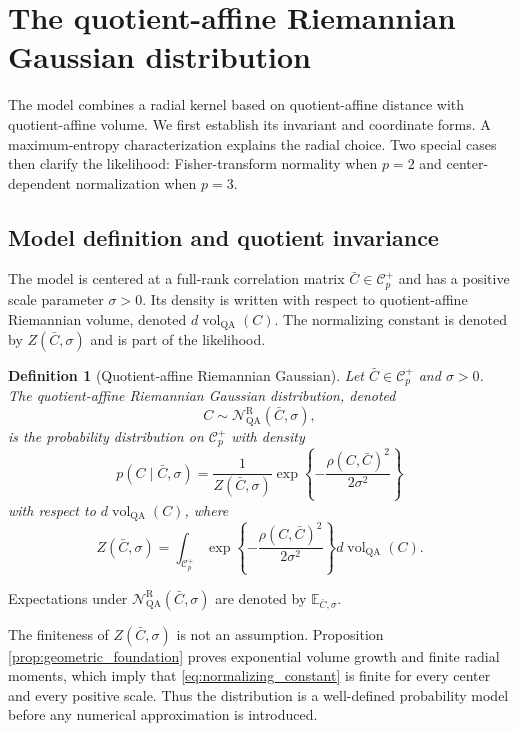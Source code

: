 \documentclass[
  12pt]{article}
\newcommand{\Corr}{\mathcal C^+}
\newcommand{\vol}{\operatorname{vol}}
\newcommand{\E}{\mathbb E}
\newcommand{\QA}{\mathrm{QA}}
\newcommand{\NR}{\mathcal N^{\mathrm R}_{\mathrm{QA}}}
\newtheorem{definition}{Definition}
\begin{document}
\section{The quotient-affine Riemannian Gaussian distribution}\label{sec:model}



The model combines a radial kernel based on quotient-affine distance with quotient-affine volume. We first establish its invariant and coordinate forms. A maximum-entropy characterization explains the radial choice. Two special cases then clarify the likelihood: Fisher-transform normality when $p=2$ and center-dependent normalization when $p=3$.



\subsection{Model definition and quotient invariance}

The model is centered at a full-rank correlation matrix $\bar C\in\Corr_p$ and has a positive scale parameter $\sigma>0$. Its density is written with respect to quotient-affine Riemannian volume, denoted $d\vol_{\QA}(C)$. The normalizing constant is denoted by $Z(\bar C,\sigma)$ and is part of the likelihood.

\begin{definition}[Quotient-affine Riemannian Gaussian]\label{def:rg}
Let $\bar C\in\Corr_p$ and $\sigma>0$. The quotient-affine Riemannian Gaussian distribution, denoted
\[
C\sim\NR(\bar C,\sigma),
\]
is the probability distribution on $\Corr_p$ with density
\begin{equation}\label{eq:rg_density}
p(C\mid \bar C,\sigma)=\frac{1}{Z(\bar C,\sigma)}\exp\left\{-\frac{\rho(C,\bar C)^2}{2\sigma^2}\right\}
\end{equation}
with respect to $d\vol_{\QA}(C)$, where
\begin{equation}\label{eq:normalizing_constant}
Z(\bar C,\sigma)=\int_{\Corr_p}\exp\left\{-\frac{\rho(C,\bar C)^2}{2\sigma^2}\right\}d\vol_{\QA}(C).
\end{equation}
\end{definition}
Expectations under $\NR(\bar C,\sigma)$ are denoted by $\E_{\bar C,\sigma}$.


The finiteness of $Z(\bar C,\sigma)$ is not an assumption. Proposition \ref{prop:geometric_foundation} proves exponential volume growth and finite radial moments, which imply that \eqref{eq:normalizing_constant} is finite for every center and every positive scale. Thus the distribution is a well-defined probability model before any numerical approximation is introduced.
\end{document}
